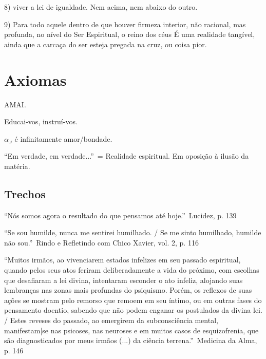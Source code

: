 \documentclass[12pt,a4paper]{article}
\begin{document}
8) viver a lei de igualdade. Nem acima, nem abaixo do outro.

9) Para todo aquele dentro de que houver firmeza interior, n\~ao racional,
 mas profunda, no n\'ivel do Ser Espiritual, o reino dos c\'eus \'E uma
realidade tang\'ivel, ainda que a carca\c{c}a do ser esteja pregada na cruz,
ou coisa pior.

	\section{Axiomas}
			\begin{flushright}
			\end{flushright}

		AMAI.

		Educai-vos, instru\'i-vos.

		$ \alpha_\omega $ \'e infinitamente amor/bondade.

		\textquotedblleft Em verdade, em verdade...\textquotedblright\, = Realidade espiritual. Em oposi\c{c}\~ao \`a ilus\~ao\cite{x} da mat\'eria.

	\subsection{Trechos}
			\begin{flushright}
			\end{flushright}

\textquotedblleft N\'os somos agora o resultado do que pensamos at\'e hoje.\textquotedblright\, Lucidez, p. 139

			\begin{flushright}
			\end{flushright}

\textquotedblleft Se sou humilde, nunca me sentirei humilhado. / Se me sinto humilhado, humilde n\~ao sou.\textquotedblright\, Rindo e Refletindo com Chico Xavier, vol. 2, p. 116

			\begin{flushright}
			\end{flushright}

\textquotedblleft Muitos irm\~aos, ao vivenciarem estados infelizes em seu passado espiritual, quando pelos seus atos feriram deliberadamente a vida do pr\'oximo, com escolhas que desafiaram a lei divina, intentaram esconder o ato infeliz, alojando suas lembran\c{c}as nas zonas mais profundas do psiquismo. Por\'em, os reflexos de suas a\c{c}\~oes se mostram pelo remorso que remoem em seu \'intimo, ou em outras fases do pensamento doentio, sabendo que n\~ao podem enganar os postulados da divina lei. / Estes reveses do passado, ao emergirem da subconsci\^encia mental, manifestam|se nas psicoses, nas neuroses e em muitos casos de esquizofrenia, que s\~ao diagnosticados por meus irm\~aos (...) da ci\^encia terrena.\textquotedblright\, Medicina da Alma, p. 146
\end{document}
